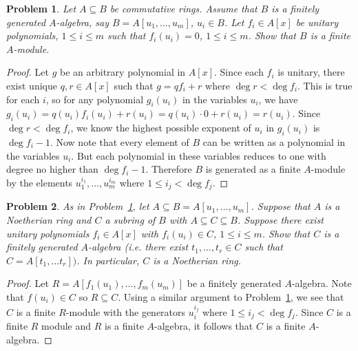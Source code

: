 \documentclass{article}
\newtheorem{problem}{Problem}
\begin{document}
\begin{problem}
\label{unitary}
Let $A \subseteq B$ be commutative rings. Assume that $B$ is a finitely generated $A$-algebra, say $B = A[u_1, \dots , u_m]$, $u_i \in B$. Let $f_i \in A[x]$ be unitary polynomials, $1 \leq i \leq m$ such that $f_i(u_i) = 0$, $1 \leq i \leq m$. Show that $B$ is a finite $A$-module.
\end{problem}
\begin{proof}
Let $g$ be an arbitrary polynomial in $A[x]$. Since each $f_i$ is unitary, there exist unique $q, r \in A[x]$ such that $g = qf_i + r$ where $\deg r < \deg f_i$. This is true for each $i$, so for any polynomial $g_i(u_i)$ in the variables $u_i$, we have $g_i(u_i) = q(u_i) f_i(u_i) + r(u_i) = q(u_i) \cdot 0 + r(u_i) = r(u_i)$. Since $\deg r < \deg f_i$, we know the highest possible exponent of $u_i$ in $g_i(u_i)$ is $\deg f_i - 1$. Now note that every element of $B$ can be written as a polynomial in the variables $u_i$. But each polynomial in these variables reduces to one with degree no higher than $\deg f_i - 1$. Therefore $B$ is generated as a finite $A$-module by the elements $u_1^{i_1}, \dots , u_m^{i_m}$ where $1 \leq i_j < \deg f_j$.
\end{proof}

\begin{problem}
\label{unitary2}
As in Problem~\ref{unitary}, let $A \subseteq B = A[u_1, \dots , u_m]$. Suppose that $A$ is a Noetherian ring and $C$ a subring of $B$ with $A \subseteq C \subseteq B$. Suppose there exist unitary polynomials $f_i \in A[x]$ with $f_i(u_i) \in C$, $1 \leq i \leq m$. Show that $C$ is a finitely generated $A$-algebra (i.e. there exist $t_1, \dots , t_r \in C$ such that $C = A[t_1, \dots t_r])$. In particular, $C$ is a Noetherian ring.
\end{problem}
\begin{proof}
Let $R = A[f_1(u_1), \dots , f_m(u_m)]$ be a finitely generated $A$-algebra. Note that $f(u_i) \in C$ so $R \subseteq C$. Using a similar argument to Problem~\ref{unitary}, we see that $C$ is a finite $R$-module with the generators $u_i^{i_j}$ where $1 \leq i_j < \deg f_j$. Since $C$ is a finite $R$ module and $R$ is a finite $A$-algebra, it follows that $C$ is a finite $A$-algebra.
\end{proof}
\end{document}
